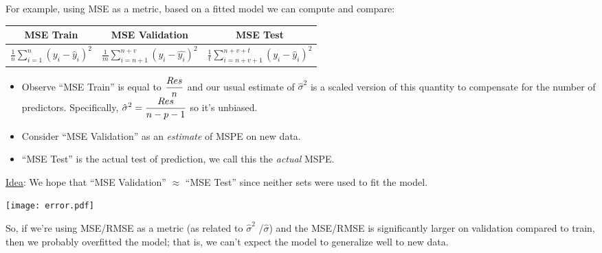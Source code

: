 For example, using MSE as a metric, based on a fitted model we can
compute and compare:
\begin{table}[ht]
    \centering
    \begin{NiceTabular}{|c|c|c|}
        \toprule
        MSE Train & MSE Validation & MSE Test \\
        \midrule
        $ \frac{1}{n} \sum_{i=1}^{n} (y_i-\hat{y}_i)^2 $
        &
        $ \frac{1}{m} \sum_{i=n+1}^{n+v} (y_i-\hat{y_i})^2 $
        &
        $ \frac{1}{t} \sum_{i=n+v+1}^{n+v+t}(y_i-\hat{y}_i)^2 $
        \\
        \bottomrule
    \end{NiceTabular}
\end{table}

\begin{itemize}
    \item Observe ``MSE Train'' is equal to $ \displaystyle \frac{\relax{Res}}{n} $
          and our usual estimate of $ \hat{\sigma}^2 $
          is a scaled version of this quantity
          to compensate for the number of predictors. Specifically,
          $ \displaystyle  \hat{\sigma}^2=\frac{\relax{Res}}{n-p-1} $
          so it's unbiased.
    \item Consider ``MSE Validation'' as an \emph{estimate} of MSPE
          on new data.
    \item ``MSE Test'' is the actual test of prediction,
          we call this the \emph{actual} MSPE.\
\end{itemize}
\underline{Idea}: We hope that ``MSE Validation'' $ \approx $
``MSE Test'' since neither sets were used to fit the model.

\begin{minipage}{0.7\textwidth}
    \texttt{[image: error.pdf]}
\end{minipage}
\begin{minipage}{0.23\textwidth}
    \raggedright{}
    So, if we're using MSE/RMSE
    as a metric (as related to $ \hat{\sigma}^2 $ /$ \hat{\sigma} $)
    and the MSE/RMSE is significantly larger
    on validation compared to train,
    then we probably overfitted the model;
    that is, we can't expect the model
    to generalize well to new data.
\end{minipage}

